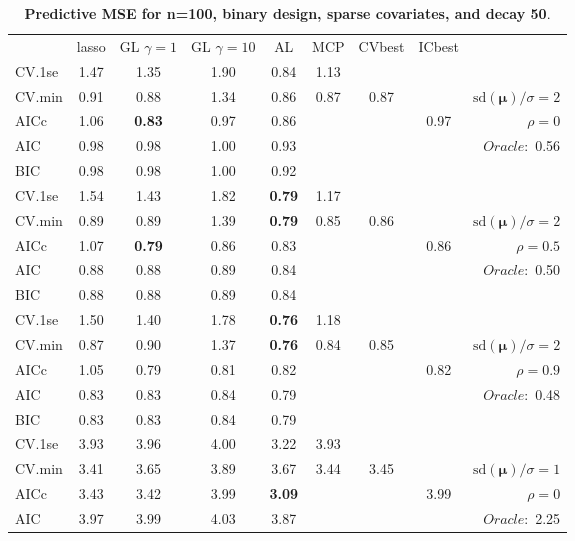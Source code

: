 \clearpage
\begin{table}\vspace{-.5cm}
\caption[l]{ { \bf Predictive MSE for n=100, binary design, 
sparse covariates, and  decay  50}.}
\vspace{-.5cm}
\footnotesize{}
\begin{center}
\begin{tabular}{l*{7}{c}|r}
 & lasso & GL $\gamma=1$ & GL $\gamma=10$ & AL & MCP  & CVbest & ICbest  \\
\cline{1-9}
CV.1se & 1.47 & 1.35 & 1.90 & 0.84 & 1.13 & & & \\
CV.min & 0.91 & 0.88 & 1.34 & 0.86 & 0.87 & 0.87 & & $\mathrm{sd}(\mathbf{\mu})/\sigma=2$ \\
AICc & 1.06 & {\bf 0.83} & 0.97 & 0.86 & & & 0.97 &  $\rho=0$ \\
AIC & 0.98 & 0.98 & 1.00 & 0.93 & & & &  \multirow{2}{*}{$Oracle: $ 0.56} \\
BIC & 0.98 & 0.98 & 1.00 & 0.92 & & & &  \\
 \hline 
CV.1se & 1.54 & 1.43 & 1.82 & {\bf 0.79} & 1.17 & & & \\
CV.min & 0.89 & 0.89 & 1.39 & {\bf 0.79} & 0.85 & 0.86 & & $\mathrm{sd}(\mathbf{\mu})/\sigma=2$ \\
AICc & 1.07 & {\bf 0.79} & 0.86 & 0.83 & & & 0.86 &  $\rho=0.5$ \\
AIC & 0.88 & 0.88 & 0.89 & 0.84 & & & &  \multirow{2}{*}{$Oracle: $ 0.50} \\
BIC & 0.88 & 0.88 & 0.89 & 0.84 & & & &  \\
 \hline 
CV.1se & 1.50 & 1.40 & 1.78 & {\bf 0.76} & 1.18 & & & \\
CV.min & 0.87 & 0.90 & 1.37 & {\bf 0.76} & 0.84 & 0.85 & & $\mathrm{sd}(\mathbf{\mu})/\sigma=2$ \\
AICc & 1.05 & 0.79 & 0.81 & 0.82 & & & 0.82 &  $\rho=0.9$ \\
AIC & 0.83 & 0.83 & 0.84 & 0.79 & & & &  \multirow{2}{*}{$Oracle: $ 0.48} \\
BIC & 0.83 & 0.83 & 0.84 & 0.79 & & & &  \\
 \hline 
CV.1se & 3.93 & 3.96 & 4.00 & 3.22 & 3.93 & & & \\
CV.min & 3.41 & 3.65 & 3.89 & 3.67 & 3.44 & 3.45 & & $\mathrm{sd}(\mathbf{\mu})/\sigma=1$ \\
AICc & 3.43 & 3.42 & 3.99 & {\bf 3.09} & & & 3.99 &  $\rho=0$ \\
AIC & 3.97 & 3.99 & 4.03 & 3.87 & & & &  \multirow{2}{*}{$Oracle: $ 2.25} \\

\end{tabular}
\end{center}
\end{table}

